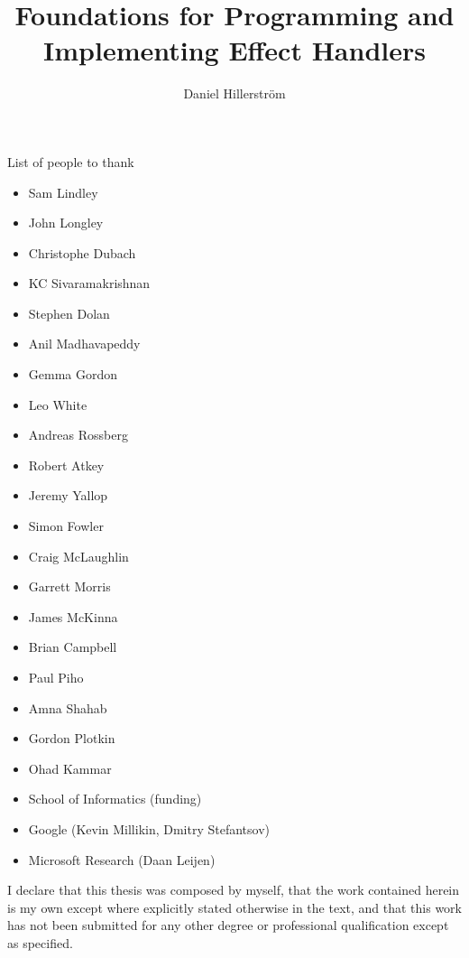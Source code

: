 \documentclass[11pt,phd,lfcs,twoside,openright,logo,leftchapter,normalheadings]{infthesis}
\title{Foundations for Programming and Implementing Effect Handlers}
\author{Daniel Hillerström}
\begin{document}
\raggedbottom
\begin{preliminary}

\maketitle

\begin{acknowledgements}
  List of people to thank
  \begin{itemize}
    \item Sam Lindley
    \item John Longley
    \item Christophe Dubach
    \item KC Sivaramakrishnan
    \item Stephen Dolan
    \item Anil Madhavapeddy
    \item Gemma Gordon
    \item Leo White
    \item Andreas Rossberg
    \item Robert Atkey
    \item Jeremy Yallop
    \item Simon Fowler
    \item Craig McLaughlin
    \item Garrett Morris
    \item James McKinna
    \item Brian Campbell
    \item Paul Piho
    \item Amna Shahab
    \item Gordon Plotkin
    \item Ohad Kammar
    \item School of Informatics (funding)
    \item Google (Kevin Millikin, Dmitry Stefantsov)
    \item Microsoft Research (Daan Leijen)
  \end{itemize}
\end{acknowledgements}

\begin{declaration}
  I declare that this thesis was composed by myself, that the work
  contained herein is my own except where explicitly stated otherwise
  in the text, and that this work has not been submitted for any other
  degree or professional qualification except as specified.
\end{declaration}


\end{preliminary}
\end{document}
